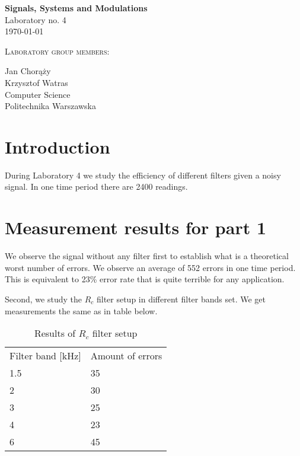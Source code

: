 \documentclass{article}
\begin{document}
\begin{titlepage}
   \begin{center}
       \vspace*{1cm}

       \textbf{\Huge Signals, Systems and Modulations} \\
        \vspace{2.0cm}
        \huge{Laboratory no. 4}
         \vspace{.7cm}
       \huge{\\ \today}

        \vspace{3.0cm}
        \textsc{Laboratory group members:}
        
        \vspace{0.4cm}
        Jan Chorąży\\
         \vspace{0.4cm}
        Krzysztof Watras\\
         
        \vspace{2 cm}   
       \small{Computer Science} \\  
       \vspace{0.2cm}       
       \small{Politechnika Warszawska} 
       \date{\today}
   \end{center}
\end{titlepage} 

\section*{Introduction}
During Laboratory 4 we study the efficiency of different filters given a noisy
signal. In one time period there are 2400 readings. 

\section*{Measurement results for part 1}
We observe the signal without any filter first to establish what is a
theoretical worst number of errors. We observe an average of 552 errors in one
time period. This is equivalent to 23\% error rate that is quite terrible for
any application.

Second, we study the $R_c$ filter setup in different filter bands set. 
We get measurements the same as in table below.
\begin{table}[ht!]
    \caption{Results of $R_c$ filter setup}
    \label{tab:Rcresults}
    \begin{center}
        \begin{tabular}[c]{l|l}
            Filter band [kHz] & Amount of errors \\
            1.5 & 35 \\
            2 & 30   \\
            3 & 25   \\
            4 & 23   \\
            6 & 45   \\
        \end{tabular}
    \end{center}
\end{table}
\end{document}
